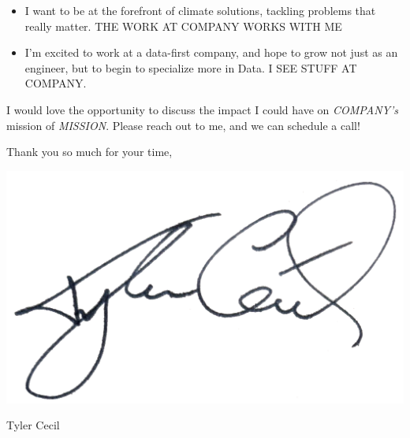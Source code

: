 \documentclass{tc_cv}
\begin{document}
\begin{adjustwidth}{40pt}{40pt}
\begin{itemize}
    \item I want to be at the forefront of climate solutions, tackling problems
      that really matter. THE WORK AT COMPANY WORKS WITH ME

    \item I'm excited to work at a data-first company, and hope to grow not
      just as an engineer, but to begin to specialize more in Data. I SEE STUFF
      AT COMPANY.
  \end{itemize} \medskip


  I would love the opportunity to discuss the impact I could have on
  \emph{COMPANY's} mission of \emph{MISSION}. Please reach out to me, and we
  can schedule a call!  \bigskip

  \begin{minipage}{0.5\linewidth}
    Thank you so much for your time,
    \vspace{1em}
  \end{minipage}
  \begin{minipage}{0.5\linewidth}
    \vspace{-1em}
    \hfill\includegraphics[height=4.5\baselineskip]{sig}

    \vspace{-2em}
    \hfill Tyler Cecil
  \end{minipage}

\end{adjustwidth}
\end{document}
